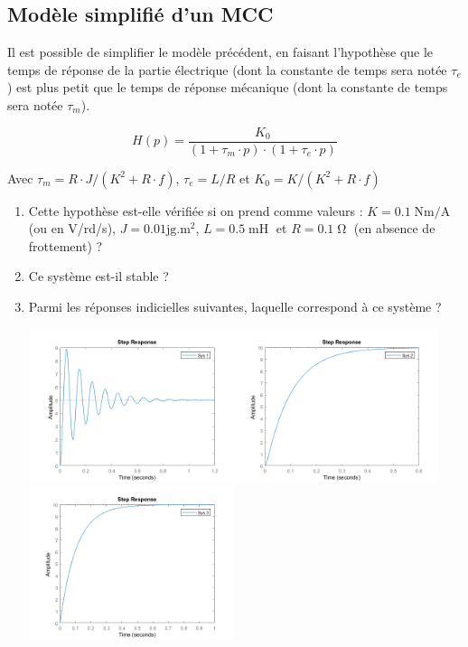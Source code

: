 \documentclass[10pt]{article} %
\begin{document}
\subsection*{Modèle simplifié d'un MCC}

Il est possible de simplifier le modèle précédent, en faisant l'hypothèse que le temps de réponse de la partie électrique (dont la constante de temps sera notée $\tau_e$) est plus petit que le temps de réponse mécanique (dont la constante de temps sera notée $\tau_m$).

$$H(p) = \frac{K_0}{(1 + \tau_m \cdot p) \cdot (1 + \tau_e \cdot p)}$$

Avec $\tau_m = R \cdot J / (K^2 + R \cdot f)$, $\tau_e = L / R $ et $K_0 = K / (K^2 + R \cdot f)$

\medskip

\begin{enumerate}
	\item Cette hypothèse est-elle vérifiée si on prend comme valeurs : $K = 0.1\operatorname{Nm/A}$ (ou en V/rd/s), $J = 0.01\operatorname{jg.m^2}$, $L = 0.5\operatorname{mH}$ et $R = 0.1\operatorname{\Omega}$ (en absence de frottement) ?
	\item Ce système est-il stable ?
	\item Parmi les réponses indicielles suivantes, laquelle correspond à ce système ?
	
	\begin{center}
		\includegraphics[width=6cm]{images/moteur_sys1.png}\includegraphics[width=6cm]{images/moteur_sys2.png}\includegraphics[width=6cm]{images/moteur_sys3.png}
	\end{center}
\end{enumerate}
\end{document}
